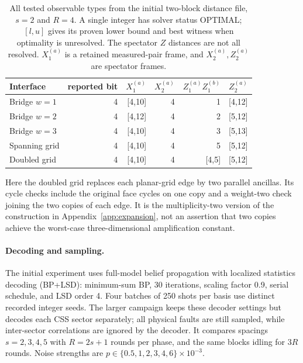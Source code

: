 \begin{table}[t]
\caption{All tested observable types from the initial two-block distance
file, $s=2$ and $R=4$. A single integer has solver status OPTIMAL; $[l,u]$
gives its proven lower bound and best witness when optimality is unresolved.
The spectator $Z$ distances are not all resolved. $X_1^{(a)}$ is a retained
measured-pair frame, and $X_2^{(a)},Z_2^{(a)}$ are spectator frames.}
\label{tab:all-distances}
\centering\small
\begin{tabular}{@{}lrrrrr@{}}
\toprule
Interface & reported bit & $X_1^{(a)}$ & $X_2^{(a)}$ & $Z_1^{(a)}Z_1^{(b)}$ & $Z_2^{(a)}$\\
\midrule
Bridge $w=1$ & 4 & [4,10] & 4 & 1 & [4,12]\\
Bridge $w=2$ & 4 & [4,12] & 4 & 2 & [5,12]\\
Bridge $w=3$ & 4 & [4,10] & 4 & 3 & [5,13]\\
Spanning grid & 4 & [4,10] & 4 & 5 & [5,12]\\
Doubled grid & 4 & [4,10] & 4 & [4,5] & [5,12]\\
\bottomrule
\end{tabular}
\end{table}

Here the doubled grid replaces each planar-grid edge by two parallel
ancillas. Its cycle checks include the original face cycles on one copy
and a weight-two check joining the two copies of each edge. It is the
multiplicity-two version of the construction in
Appendix~\ref{app:expansion}, not an assertion that two copies achieve the
worst-case three-dimensional amplification constant.

\paragraph{Decoding and sampling.}
The initial experiment uses full-model belief propagation with localized
statistics decoding (BP+LSD): minimum-sum BP, 30 iterations, scaling factor
0.9, serial schedule, and LSD order 4. Four batches of 250 shots per basis
use distinct recorded integer seeds. The larger campaign keeps these decoder
settings but decodes each CSS sector separately; all physical faults are
still sampled, while inter-sector correlations are ignored by the decoder.
It compares spacings $s=2,3,4,5$ with $R=2s+1$ rounds per phase, and the
same blocks idling for $3R$ rounds. Noise strengths are
$p\in\{0.5,1,2,3,4,6\}\times10^{-3}$.

